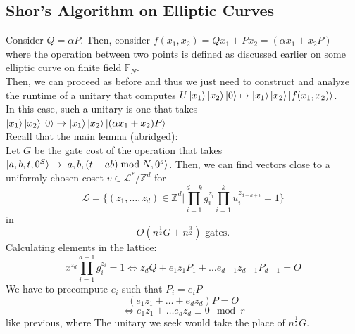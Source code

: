 \documentclass{article}
\begin{document}
\subsection{Shor's Algorithm on Elliptic Curves}
Consider $Q = \alpha P$. Then, consider $f(x_1,x_2) = Qx_1 + Px_2 = (\alpha x_1 + x_2P)$ where the operation between two points is defined as discussed earlier on some elliptic curve on finite field $\mathbb{F}_N$.\\
Then, we can proceed as before and thus we just need to construct and analyze the runtime of a unitary that computes $U\ket{x_1}\ket{x_2}\ket{0} \mapsto \ket{x_1}\ket{x_2}\ket{f(x_1,x_2)}$.\\
In this case, such a unitary is one that takes $\ket{x_1}\ket{x_2}\ket{0} \to \ket{x_1}\ket{x_2}\ket{(\alpha x_1 + x_2)P}$\\
Recall that the main lemma (abridged):\\
Let $G$ be the gate cost of the operation that takes $\ket{a,b,t,0^S} \to \ket{a,b, (t+ab)\bmod N, 0^s}$. Then, we can find vectors close to a uniformly chosen coset $v \in \mathcal{L}^*/\mathbb{Z}^d$ for $$\mathcal{L}  = \{ (z_1, \dots, z_d) \in \mathbb{Z}^d | \prod_{i=1}^{d-k} g_i^{z_i} \prod_{i=1}^{k} u_i^{z_{d-k+i}} = 1\}$$  in $$O(n^\frac{1}{2} G + n^{\frac{3}{2}}) \text{ gates.}$$
Calculating elements in the lattice:
$$x^{z_d} \prod_{i=1}^{d-1} g_i^{z_i}  =1 \iff z_d Q + e_1 z_1 P_1 + \dots e_{d-1} z_{d-1} P_{d-1} = O$$
We have to precompute $e_i$ such that $P_i = e_i P$
$$ (e_1 z_1 + \dots + e_d z_{d})P = O$$
$$\iff e_1 z_1 + \dots e_d z_d \equiv 0 \mod r$$ 
like previous, where
The unitary we seek would take the place of $n^\frac{1}{2} G$.\\
\end{document}

